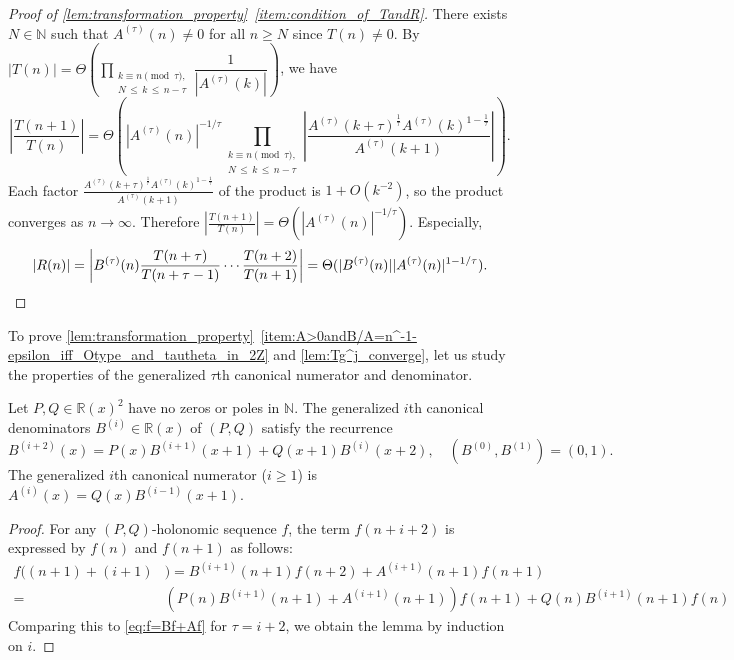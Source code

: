 \documentclass[a4paper,UKenglish,cleveref,autoref,thm-restate]{lipics-v2021}
\newcommand{\R}{\mathbb{R}}
\newcommand{\N}{\mathbb{N}}
\begin{document}
\begin{proof}[Proof of \cref{lem:transformation_property}~\eqref{item:condition_of_TandR}]
There exists $N \in \N$ such that $A^{(\tau)}(n) \neq 0$ for all $n \geq N$ since $T(n) \neq 0$. By $|T(n)| = \Theta \left( \prod\limits_{\substack{k \equiv n \!\!\! \pmod{\tau},\\ N \, \leq \, k \, \leq \, n-\tau}} \dfrac1{|A^{(\tau)}(k)|} \right)$, we have
\[
\left| \frac{T(n+1)}{T(n)} \right|
=
\Theta
\left( |A^{(\tau)}(n)|^{-1 / \tau}
\prod_{\substack{k \equiv n \!\!\! \pmod{\tau},\\ N \, \leq \, k \, \leq \, n-\tau}} \left| 
\frac{A^{(\tau)}(k+\tau)^{\frac1{\tau}} A^{(\tau)}(k)^{1 - \frac1{\tau}}}{A^{(\tau)}(k+1)} 
\right|
\right). 
\]
Each factor $\frac{A^{(\tau)}(k+\tau)^{\frac1{\tau}} A^{(\tau)}(k)^{1 - \frac1{\tau}}}{A^{(\tau)}(k+1)}$ of the product is $1 + O(k^{-2})$, so the product converges as $n \to \infty$. Therefore $\left| \frac{T(n+1)}{T(n)} \right| = \Theta \left( |A^{(\tau)}(n)|^{-1/\tau} \right)$. Especially, 
\[
|R(n)| = \left| B^{(\tau)}(n) \frac{T(n+\tau)}{T(n+\tau-1)} \dotsm \frac{T(n+2)}{T(n+1)} \right| = \Theta(|B^{(\tau)}(n)||A^{(\tau)}(n)|^{1-1 / \tau}). \qedhere
\]
\end{proof}

To prove \cref{lem:transformation_property}~\eqref{item:A>0andB/A=n^-1-epsilon_iff_Otype_and_tautheta_in_2Z} and \cref{lem:Tg^j_converge}, let us study the properties of the generalized $\tau$th canonical numerator and denominator. 

\begin{lemma} \label{lem:generalized_canonical_numerator/denominator}
Let $P, Q \in \R(x)^2$ have no zeros or poles in $\N$. The generalized $i$th canonical denominators $B^{(i)} \in \R(x)$ of $(P, Q)$ satisfy the recurrence
\begin{equation}\label{eq:B}
B^{(i+2)}(x) = P(x) B^{(i+1)}(x+1) + Q(x+1) B^{(i)}(x+2), \quad (B^{(0)}, B^{(1)}) = (0, 1). 
\end{equation}
The generalized $i$th canonical numerator ($i \geq 1$) is $A^{(i)}(x) = Q(x)B^{(i-1)}(x+1)$. 
\end{lemma}

\begin{proof}
For any $(P, Q)$-holonomic sequence $f$, the term $f(n+i+2)$ is expressed by $f(n)$ and $f(n+1)$ as follows: 
\[
\begin{aligned}
f((n+1)+(i+1)&) = B^{(i+1)}(n+1) f(n+2) +A^{(i+1)} (n+1) f(n+1) \\
=& \left( P(n)B^{(i+1)}(n+1)  + A^{(i+1)} (n+1) \right) f(n+1) + Q(n)B^{(i+1)}(n+1) f(n) 
\end{aligned}
\]
Comparing this to \cref{eq:f=Bf+Af} for $\tau = i+2$, we obtain the lemma by induction on $i$. 
\end{proof}
\end{document}
